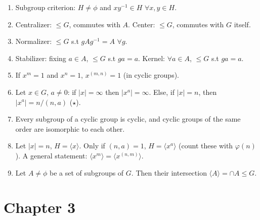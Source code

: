 \documentclass{article}
\begin{document}
\begin{enumerate}[1.]
    \item Subgroup criterion: $H \not= \phi$ and $xy^{-1} \in H$ $\forall x,y
        \in H$.
    \item Centralizer: $\leq G$, commutes with $A$. Center: $\leq G$,
        commutes with $G$ itself.
    \item Normalizer: $\leq G$ s.t $gAg^{-1} = A$ $\forall g$.
    \item Stabilizer: fixing $a \in A$, $\leq G$ s.t $ga = a$. Kernel:
        $\forall a \in A$, $\leq G$ s.t $ga = a$.
    \item If $x^m = 1$ and $x^n = 1$, $x^{(m, n)} = 1$ (in cyclic groups).
    \item Let $x \in G$, $a \not= 0$: if $|x| = \infty$ then $|x^a| =
        \infty$. Else, if $|x| = n$, then $|x^a| = n/(n, a)$ ($\star$).
    \item Every subgroup of a cyclic group is cyclic, and cyclic groups of
        the same order are isomorphic to each other.
    \item Let $|x| = n$, $H = \langle x \rangle$. Only if $(n, a) = 1$, $H =
        \langle x^a \rangle$ (count these with $\varphi(n)$).
        A general statement: $\langle x^m \rangle = \langle x^{(n, m)}
        \rangle$.
    \item Let $A \not= \phi$ be a set of subgroups of $G$. Then their
        intersection $\langle A \rangle = \cap A \leq G$.
\end{enumerate}

\section*{Chapter 3}
\end{document}
